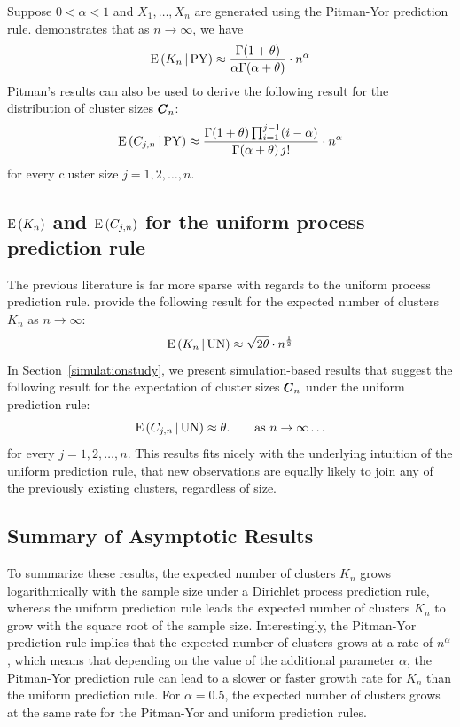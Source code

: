 \documentclass[]{article}
\begin{document}
Suppose $0 < \alpha < 1$ and $X_1,\ldots, X_n$ are generated using the
Pitman-Yor prediction rule.  \cite{Pit02} demonstrates that as $n \to
\infty$, we have
\begin{equation}
{\rm E}\,(K_n \,|\,{\rm PY}) \approx \frac{\Gamma(1 + \theta)}{
  \alpha\Gamma(\alpha +
\theta)} \cdot  n^{\alpha} \label{PYmom2}
\end{equation}
Pitman's results \cite{Pit02} can also be used to derive the
following result for the distribution of cluster sizes $\pmb{C}_n$:
\begin{equation}
{\rm E}\,(C_{j,n} \,|\,{\rm PY}) \approx \frac{\Gamma(1 +
  \theta) \prod_{i=1}^{j-1} (i - \alpha)}{\Gamma(\alpha +
\theta)\,  j !} \cdot n^{\alpha}  \label{PYmom4}
\end{equation}
for every cluster size $j = 1, 2,\ldots,n$.

\subsection{${\rm E}\,(K_n)$ and ${\rm E}\,(C_{j,n})$ for the uniform process
  prediction rule} \label{UN_asymptotic}

The previous literature is far more sparse with regards to the uniform
process prediction rule.  \cite{DicJen08} provide the following result for the
expected number of clusters $K_n$ as $n \to \infty$:
\begin{equation}
{\rm E}\,(K_n\,|\,{\rm UN}) \approx \sqrt{2 \theta} \cdot
n^{\frac{1}{2}} \label{UNmom2}
\end{equation}
In Section~\ref{simulationstudy}, we present simulation-based results
that suggest
the following result for the expectation of cluster sizes $\pmb{C}_n$
under the uniform prediction rule:
\begin{equation}
{\rm E}\,(C_{j,n} \,|\, {\rm UN}) \approx \theta.   \qquad
\hbox{as} \,\, n \to \infty 
\ldots \label{UNmom4}
\end{equation}
for every $j = 1, 2,\ldots,n$.  This results fits nicely with the
underlying intuition of the uniform prediction rule, that new
observations are equally likely to join any of the previously existing
clusters, regardless of size.

\subsection{Summary of Asymptotic Results}

To summarize these results, the expected number of clusters $K_n$
grows logarithmically with the sample size under a Dirichlet process
prediction rule, whereas the uniform prediction rule leads the
expected number of clusters $K_n$ to grow with the square root of the
sample size.  Interestingly, the Pitman-Yor prediction rule implies
that the expected number of clusters grows at a rate of $n^\alpha$,
which means that depending on the value of the additional parameter
$\alpha$, the Pitman-Yor prediction rule can lead to a slower or
faster growth rate for $K_n$ than the uniform prediction rule.  For
$\alpha = 0.5$, the expected number of clusters grows at the same rate
for the Pitman-Yor and uniform prediction rules.
\end{document}

